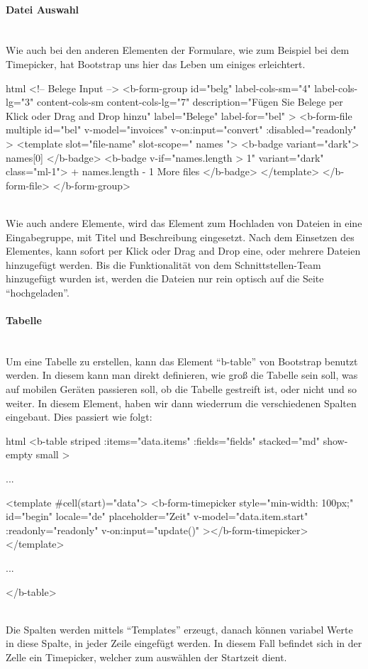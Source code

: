 \paragraph{Datei Auswahl}
~\\
Wie auch bei den anderen Elementen der Formulare, wie zum Beispiel bei dem Timepicker, hat Bootstrap uns hier das Leben um einiges erleichtert. 
\begin{code}{html}
	<!-- Belege Input -->
	<b-form-group
	  id="belg"
	  label-cols-sm="4"
	  label-cols-lg="3"
	  content-cols-sm
	  content-cols-lg="7"
	  description="Fügen Sie Belege per Klick oder Drag and Drop hinzu"
	  label="Belege"
	  label-for="bel"
	>
	  <b-form-file
		multiple
		id="bel"
		v-model="invoices"
		v-on:input="convert"
		:disabled="readonly"
	  >
		<template slot="file-name" slot-scope="{ names }">
		  <b-badge variant="dark">{{ names[0] }}</b-badge>
		  <b-badge v-if="names.length > 1" variant="dark" class="ml-1">
			+ {{ names.length - 1 }} More files
		  </b-badge>
		</template>
	  </b-form-file>
	</b-form-group>
\end{code}
	\label{list:dateiselect} ~\\
Wie auch andere Elemente, wird das Element zum Hochladen von Dateien in eine Eingabegruppe, mit Titel und Beschreibung eingesetzt. Nach dem Einsetzen des Elementes, kann sofort per Klick oder Drag and Drop eine, oder mehrere Dateien hinzugefügt werden. Bis die Funktionalität von dem Schnittstellen-Team hinzugefügt wurden ist, werden die Dateien nur rein optisch auf die Seite \enquote{hochgeladen}. 
\paragraph{Tabelle}
~\\
Um eine Tabelle zu erstellen, kann das Element \enquote{b-table} von Bootstrap benutzt werden. In diesem kann man direkt definieren, wie groß die Tabelle sein soll, was auf mobilen Geräten passieren soll, ob die Tabelle gestreift ist, oder nicht und so weiter. In diesem Element, haben wir dann wiederrum die verschiedenen Spalten eingebaut. Dies passiert wie folgt:
\begin{code}{html}
	<b-table
          striped
          :items="data.items"
          :fields="fields"
          stacked="md"
          show-empty
          small
    >

		...

		<template #cell(start)="data">
			<b-form-timepicker
				style="min-width: 100px;"
				id="begin"
				locale="de"
				placeholder="Zeit"
				v-model="data.item.start"
				:readonly="readonly"
				v-on:input="update()"
			></b-form-timepicker>
		</template>

		...

	</b-table>
\end{code}
	\label{list:bsptable} ~\\
Die Spalten werden mittels \enquote{Templates} erzeugt, danach können variabel Werte in diese Spalte, in jeder Zeile eingefügt werden. In diesem Fall befindet sich in der Zelle ein Timepicker, welcher zum auswählen der Startzeit dient.
\newpage
